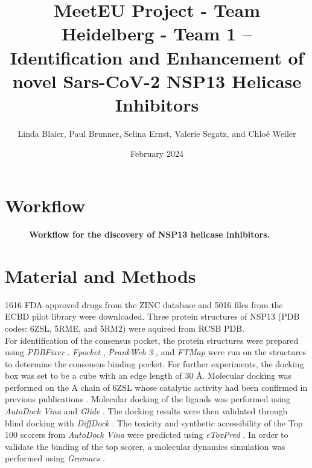 \documentclass[11pt, letterpaper, titlepage]{article}
\title{MeetEU Project - Team Heidelberg - Team 1 -- \\ Identification and Enhancement of novel Sars-CoV-2 NSP13 Helicase Inhibitors}
\author{Linda Blaier, Paul Brunner, Selina Ernst, Valerie Segatz, and Chlo\'{e} Weiler}
\date{February 2024}
\renewcommand{\cite}{\parencite}
\begin{document}
\maketitle

\ihead{\headmark}
\cfoot{\pagemark}   %

\section{Workflow}

\begin{figure}[h]
  \centering
  \caption*{\textbf{Workflow for the discovery of NSP13 helicase inhibitors.}}
  \label{workflow}
\end{figure}

\setcounter{figure}{0}
\renewcommand{\thefigure}{\arabic{figure}}


\section{Material and Methods}
1616 FDA-approved drugs from the ZINC database \cite{Irwin.2020} and 5016 files from the ECBD pilot library were downloaded.
Three protein structures of NSP13 (PDB codes: 6ZSL, 5RME, and 5RM2) were aquired from RCSB PDB. \\
\noindent For identification of the consensus pocket, the protein structures were prepared using \textit{PDBFixer} \cite{Eastman_2017}. \textit{Fpocket} \cite{package_Fpocket}, \textit{PrankWeb 3} \cite{package_P2Rank,package_PrankWeb,package_PrankWeb3}, and \textit{FTMap} \cite{package_FTMAP} were run on the structures to determine the consensus binding pocket. For further experiments, the docking box was set to be a cube with an edge length of 30 \AA. Molecular docking was performed on the A chain of 6ZSL whose catalytic activity had been confirmed in previous publications \cite{Berta_2021}. Molecular docking of the ligands was performed using \textit{AutoDock Vina} \cite{Trott.2010} and \textit{Glide} \cite{Friesner2004}. The docking results were then validated through blind docking with \textit{DiffDock} \cite{Corso.2022}. The toxicity and synthetic accessibility of the Top 100 scorers from \textit{AutoDock Vina} were predicted using \textit{eToxPred} \cite{pu2019toxpred}.
In order to validate the binding of the top scorer, a molecular dynamics simulation was performed using \textit{Gromacs} \cite{packageGROMACS}.\\
\end{document}
